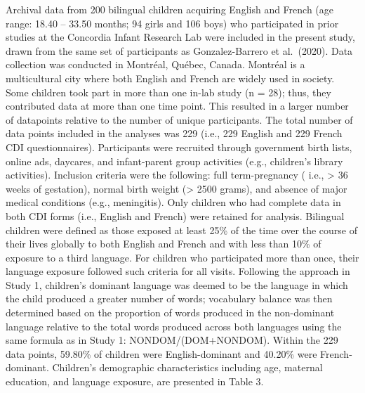 \documentclass[
  english,
  ,man,floatsintext]{apa6}
\begin{document}
Archival data from 200 bilingual children acquiring English and French (age range: 18.40 -- 33.50 months; 94 girls and 106 boys) who participated in prior studies at the Concordia Infant Research Lab were included in the present study, drawn from the same set of participants as Gonzalez-Barrero et al.~(2020). Data collection was conducted in Montréal, Québec, Canada. Montréal is a multicultural city where both English and French are widely used in society. Some children took part in more than one in-lab study (n = 28); thus, they contributed data at more than one time point. This resulted in a larger number of datapoints relative to the number of unique participants. The total number of data points included in the analyses was 229 (i.e., 229 English and 229 French CDI questionnaires). Participants were recruited through government birth lists, online ads, daycares, and infant-parent group activities (e.g., children's library activities). Inclusion criteria were the following: full term-pregnancy ( i.e., \textgreater{} 36 weeks of gestation), normal birth weight (\textgreater{} 2500 grams), and absence of major medical conditions (e.g., meningitis). Only children who had complete data in both CDI forms (i.e., English and French) were retained for analysis. Bilingual children were defined as those exposed at least 25\% of the time over the course of their lives globally to both English and French and with less than 10\% of exposure to a third language. For children who participated more than once, their language exposure followed such criteria for all visits. Following the approach in Study 1, children's dominant language was deemed to be the language in which the child produced a greater number of words; vocabulary balance was then determined based on the proportion of words produced in the non-dominant language relative to the total words produced across both languages using the same formula as in Study 1: NONDOM/(DOM+NONDOM). Within the 229 data points, 59.80\% of children were English-dominant and 40.20\% were French-dominant. Children's demographic characteristics including age, maternal education, and language exposure, are presented in Table 3.

~
\end{document}
